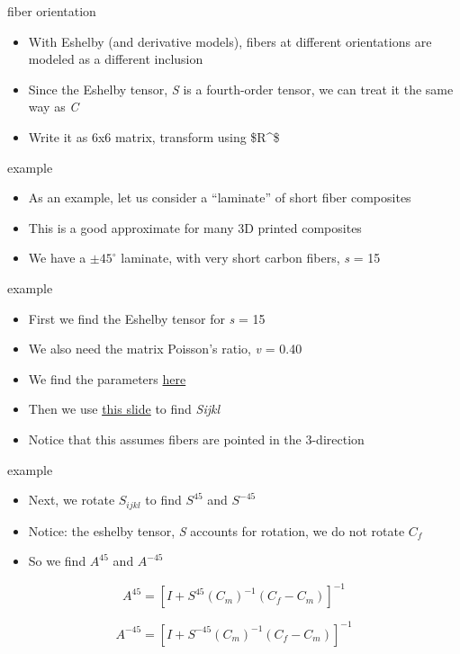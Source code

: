 \documentclass[
  letterpaper,
  ignorenonframetext,
  aspectratio=43,
  handout,
  12pt]{beamer}
\providecommand{\tightlist}{%
  \setlength{\itemsep}{0pt}\setlength{\parskip}{0pt}}
\providecommand{\tightlist}{%
\setlength{\itemsep}{0pt}\setlength{\parskip}{0pt}}
\begin{document}
\begin{frame}{fiber orientation}
\protect\hypertarget{fiber-orientation}{}
\begin{itemize}
\tightlist
\item
  With Eshelby (and derivative models), fibers at different orientations
  are modeled as a different inclusion
\item
  Since the Eshelby tensor, \emph{S} is a fourth-order tensor, we can
  treat it the same way as \emph{C}
\item
  Write it as 6x6 matrix, transform using \$R\^{}\sigma\$
\end{itemize}
\end{frame}

\begin{frame}{example}
\protect\hypertarget{example}{}
\begin{itemize}
\tightlist
\item
  As an example, let us consider a ``laminate'' of short fiber
  composites
\item
  This is a good approximate for many 3D printed composites
\item
  We have a \(\pm 45^\circ\) laminate, with very short carbon fibers,
  \emph{s} = 15
\end{itemize}
\end{frame}

\begin{frame}{example}
\protect\hypertarget{example-1}{}
\begin{itemize}
\tightlist
\item
  First we find the Eshelby tensor for \emph{s} = 15
\item
  We also need the matrix Poisson's ratio, \emph{v} = 0.40
\item
  We find the parameters \protect\hyperlink{ux2feshelby-params}{here}
\item
  Then we use \protect\hyperlink{ux2ftable}{this slide} to find
  \emph{S}\emph{ijkl}
\item
  Notice that this assumes fibers are pointed in the 3-direction
\end{itemize}
\end{frame}

\begin{frame}{example}
\protect\hypertarget{example-2}{}
\begin{itemize}
\tightlist
\item
  Next, we rotate \(S_{ijkl}\) to find \(S^{45}\) and \(S^{-45}\)
\item
  Notice: the eshelby tensor, \emph{S} accounts for rotation, we do not
  rotate \(C_f\)
\item
  So we find \(A^{45}\) and \(A^{-45}\)
\end{itemize}

\[A^{45} = \left[I + S^{45} (C_m)^{-1}(C_f-C_m) \right]^{-1}\]

\[A^{-45} = \left[I + S^{-45} (C_m)^{-1}(C_f-C_m) \right]^{-1}\]
\end{frame}
\end{document}
